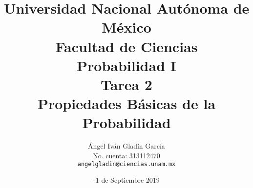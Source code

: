 \documentclass[11pt,letterpaper]{report}
\begin{document}
\title{
        Universidad Nacional Autónoma de México\\
        Facultad de Ciencias\\
        Probabilidad I\\
    \vspace{1cm}
    \large
        \textbf{Tarea 2}\\
        \textbf{Propiedades Básicas de la Probabilidad}
}
\author{
    Ángel Iván Gladín García\\
    No. cuenta: 313112470\\
    \texttt{angelgladin@ciencias.unam.mx}
}
\date{-1 de Septiembre 2019}
\maketitle

\newtheorem{theorem}{Teorema}
\newtheorem{example}{Ejemplo}
\newtheorem{corollary}{Corolario}
\newtheorem{lemma}{Lemma}
\newtheorem{definition}{Definicion}
\newtheorem{prop}{Proposicion}
\end{document}
